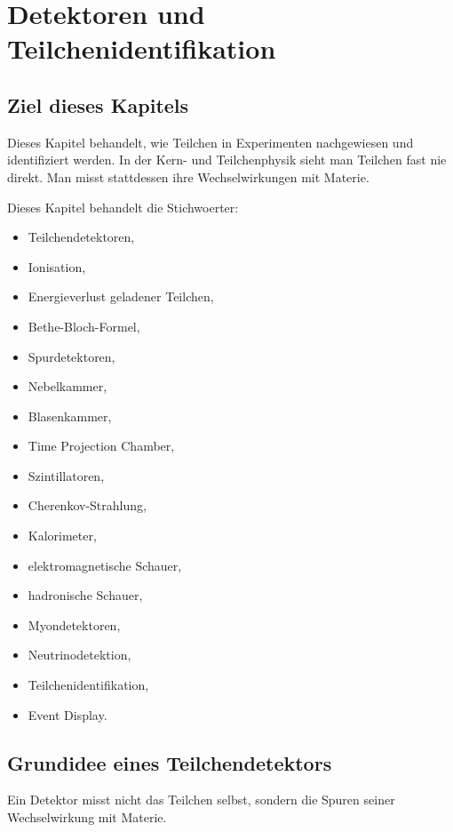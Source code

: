 \chapter{Detektoren und Teilchenidentifikation}

\section{Ziel dieses Kapitels}

Dieses Kapitel behandelt, wie Teilchen in Experimenten nachgewiesen und identifiziert
werden.
In der Kern- und Teilchenphysik sieht man Teilchen fast nie direkt.
Man misst stattdessen ihre Wechselwirkungen mit Materie.

\begin{notebox}
Dieses Kapitel behandelt die Stichwoerter:
\begin{itemize}
    \item Teilchendetektoren,
    \item Ionisation,
    \item Energieverlust geladener Teilchen,
    \item Bethe-Bloch-Formel,
    \item Spurdetektoren,
    \item Nebelkammer,
    \item Blasenkammer,
    \item Time Projection Chamber,
    \item Szintillatoren,
    \item Cherenkov-Strahlung,
    \item Kalorimeter,
    \item elektromagnetische Schauer,
    \item hadronische Schauer,
    \item Myondetektoren,
    \item Neutrinodetektion,
    \item Teilchenidentifikation,
    \item Event Display.
\end{itemize}
\end{notebox}

\section{Grundidee eines Teilchendetektors}

Ein Detektor misst nicht das Teilchen selbst, sondern die Spuren seiner Wechselwirkung
mit Materie.

